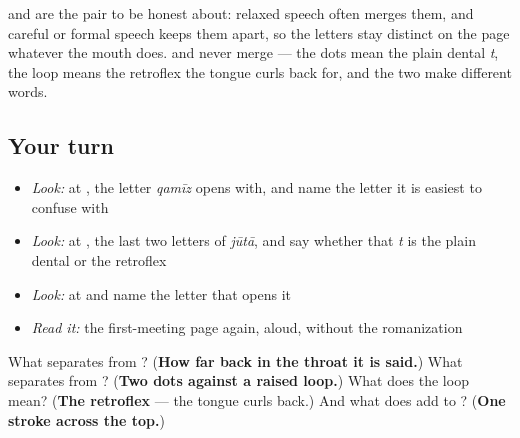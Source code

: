 \textbf{} and \textbf{} are the pair to be honest about: relaxed speech often merges them, and careful or formal speech keeps them apart, so the letters stay distinct on the page whatever the mouth does. \textbf{} and \textbf{} never merge — the dots mean the plain dental \emph{t}, the loop means the retroflex the tongue curls back for, and the two make different words.

\subsection*{Your turn}
\begin{itemize}
\raggedright
  \item \emph{Look:} at \textbf{}, the letter \emph{qamīz} opens with, and name the letter it is easiest to confuse with
  \item \emph{Look:} at \textbf{}, the last two letters of \emph{jūtā}, and say whether that \emph{t} is the plain dental or the retroflex
  \item \emph{Look:} at \textbf{} and name the letter that opens it
  \item \emph{Read it:} the first-meeting page again, aloud, without the romanization
\end{itemize}

\begin{tcolorbox}[breakable,colback=teal!4,colframe=teal!35!black,title={Before you move on}]
What separates \textbf{} from \textbf{}? (\textbf{How far back in the throat it is said.}) What separates \textbf{} from \textbf{}? (\textbf{Two dots against a raised loop.}) What does the loop mean? (\textbf{The retroflex} — the tongue curls back.) And what does \textbf{} add to \textbf{}? (\textbf{One stroke across the top.})
\end{tcolorbox}
